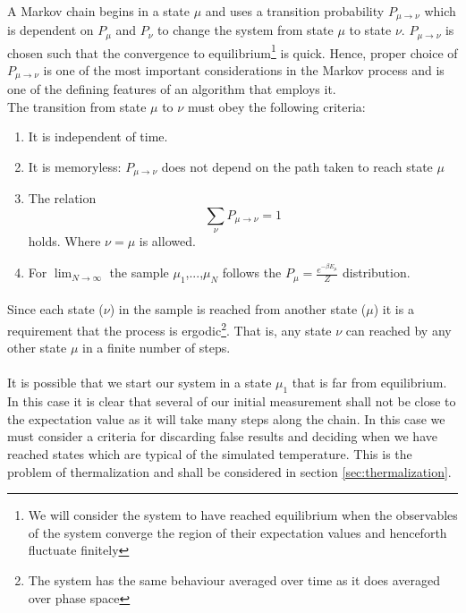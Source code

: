 \documentclass[12pt] {report} %
\begin{document}
			\paragraph{}
				A Markov chain begins in a state $\mu$ and  uses a transition probability $P_{\mu \rightarrow \nu}$ which is dependent on $P_\mu$ and $P_\nu$ to change the system from state $\mu$ to state $\nu$. $P_{\mu \rightarrow \nu}$ is chosen such that the convergence to equilibrium\footnote{We will consider the system to have reached equilibrium when the observables of the system converge the region of their expectation values and henceforth fluctuate finitely} is quick. Hence, proper choice of $P_{\mu \rightarrow \nu}$ is one of the most important considerations in the Markov process and is one of the defining features of an algorithm that employs it. \\
			
			The transition from state $\mu$ to $\nu$ must obey the following criteria:
			\begin{enumerate}
				\item It is independent of time.
				\item It is memoryless: $P_{\mu \rightarrow \nu}$ does not depend on the path taken to reach state $\mu$
				\item The relation $$\sum_{\nu} P_{\mu \rightarrow \nu} = 1$$ holds. Where $\nu = \mu$ is allowed.
				\item For $\lim_{N\to\infty}$ the sample $\mu_1$,...,$\mu_N$ follows the $P_{\mu} = \frac{e^{-\beta E_\mu}}{Z}$ distribution.
			\end{enumerate}
				
			\paragraph{}
				Since each state ($\nu$) in the sample is reached from another state ($\mu$) it is a requirement that the process is ergodic\footnote{The system has the same behaviour averaged over time as it does averaged over phase space}. That is, any state $\nu$ can reached by any other state $\mu$ in a finite number of steps.
				
			\paragraph{}
				It is possible that we start our system in a state $\mu_1$ that is far from equilibrium. In this case it is clear that several of our initial measurement shall not be close to the expectation value as it will take many steps along the chain. In this case we must consider a criteria for discarding false results and deciding when we have reached states which are typical of the simulated temperature. This is the problem of thermalization and shall be considered in section \ref{sec:thermalization}.
			
\end{document}

